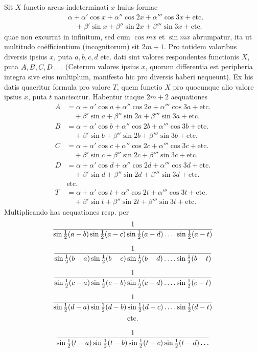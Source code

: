 Sit \(X\) functio arcus indeterminati \(x\) huius formae
\[
\begin{aligned}
&\alpha+\alpha'\cos x+\alpha''\cos 2x+\alpha'''\cos 3x+\text{etc.}\\
&\quad+\beta'\sin x+\beta''\sin 2x+\beta'''\sin 3x+\text{etc.}
\end{aligned}
\]
quae non excurrat in infinitum, sed cum \(\cos mx\) et \(\sin mx\) abrumpatur, ita
ut multitudo coëfficientium (incognitorum) sit \(2m+1\). Pro totidem valoribus diversis ipsius \(x\), puta \(a,b,c,d\) etc. dati sint valores respondentes functionis \(X\),
puta \(A,B,C,D\mathinner{.\,.\,.}\) (Ceterum valores ipsius \(x\), quorum differentia est peripheria integra sive eius multiplum, manifesto hic pro diversis haberi nequeunt). Ex
his datis quaeritur formula pro valore \(T\), quem functio \(X\) pro quocunque alio
valore ipsius \(x\), puta \(t\) nanciscitur. Habentur itaque \(2m+2\) aequationes
\[
\begin{aligned}
A&=\alpha+\alpha'\cos a+\alpha''\cos 2a+\alpha'''\cos 3a+\text{etc.}\\
 &\quad+\beta'\sin a+\beta''\sin 2a+\beta'''\sin 3a+\text{etc.}\\
B&=\alpha+\alpha'\cos b+\alpha''\cos 2b+\alpha'''\cos 3b+\text{etc.}\\
 &\quad+\beta'\sin b+\beta''\sin 2b+\beta'''\sin 3b+\text{etc.}\\
C&=\alpha+\alpha'\cos c+\alpha''\cos 2c+\alpha'''\cos 3c+\text{etc.}\\
 &\quad+\beta'\sin c+\beta''\sin 2c+\beta'''\sin 3c+\text{etc.}\\
D&=\alpha+\alpha'\cos d+\alpha''\cos 2d+\alpha'''\cos 3d+\text{etc.}\\
 &\quad+\beta'\sin d+\beta''\sin 2d+\beta'''\sin 3d+\text{etc.}\\
 &\text{etc.}\\
T&=\alpha+\alpha'\cos t+\alpha''\cos 2t+\alpha'''\cos 3t+\text{etc.}\\
 &\quad+\beta'\sin t+\beta''\sin 2t+\beta'''\sin 3t+\text{etc.}
\end{aligned}
\]
Multiplicando has aequationes resp. per
\[
\begin{gathered}
\frac{1}{\sin\tfrac12(a-b)\sin\tfrac12(a-c)\sin\tfrac12(a-d)\mathinner{.\,.\,.\,.}\sin\tfrac12(a-t)}\\[6pt]
\frac{1}{\sin\tfrac12(b-a)\sin\tfrac12(b-c)\sin\tfrac12(b-d)\mathinner{.\,.\,.\,.}\sin\tfrac12(b-t)}\\[6pt]
\frac{1}{\sin\tfrac12(c-a)\sin\tfrac12(c-b)\sin\tfrac12(c-d)\mathinner{.\,.\,.\,.}\sin\tfrac12(c-t)}\\[6pt]
\frac{1}{\sin\tfrac12(d-a)\sin\tfrac12(d-b)\sin\tfrac12(d-c)\mathinner{.\,.\,.\,.}\sin\tfrac12(d-t)}\\
\text{etc.}\\[6pt]
\frac{1}{\sin\tfrac12(t-a)\sin\tfrac12(t-b)\sin\tfrac12(t-c)\sin\tfrac12(t-d)\mathinner{.\,.\,.}}
\end{gathered}
\]
